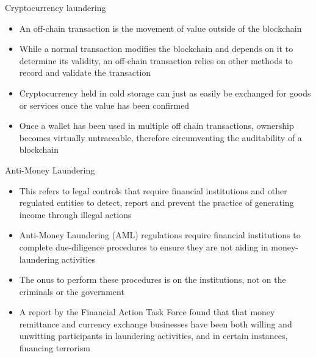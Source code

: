 \documentclass[10pt]{beamer}
\begin{document}
\begin{frame}{Cryptocurrency laundering}
	\begin{itemize}
		\item An off-chain transaction is the movement of value outside of the blockchain
		\item While a normal transaction modifies the blockchain and depends on it to determine its validity, an off-chain transaction relies on other methods to record and validate the transaction
		\item Cryptocurrency held in cold storage can just as easily be exchanged for goods or services once the value has been confirmed
		\item Once a wallet has been used in multiple off chain transactions, ownership becomes virtually untraceable, therefore circumventing the auditability of a blockchain
	\end{itemize}
\end{frame}


\begin{frame}{Anti-Money Laundering}
	\begin{itemize}
		\item This refers to legal controls that require financial institutions and other regulated entities to detect, report and prevent the practice of generating income through illegal actions
		\item Anti-Money Laundering (AML) regulations require financial institutions to complete due-diligence procedures to ensure they are not aiding in money-laundering activities
		\item The onus to perform these procedures is on the institutions, not on the criminals or the government
		\item A report by the Financial Action Task Force found that that money remittance and currency exchange businesses have been both willing and unwitting participants in laundering activities, and in certain instances, financing terrorism
	\end{itemize}
\end{frame}


\end{document}
